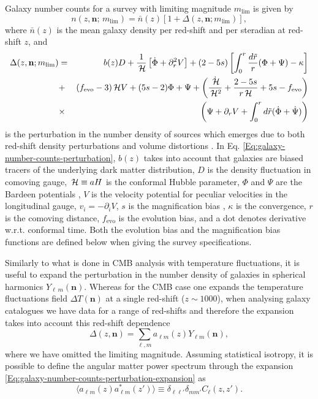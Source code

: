Galaxy number counts for a survey with limiting magnitude $m_{\mathrm{lim}}$ is given by 
\begin{equation}
\label{Eq:galaxy-number-counts}
n(z,\mathbf{n};\,m_{\mathrm{lim}}) = \bar{n}(z) \left[ 1 + \Delta(z,\mathbf{n};m_{\mathrm{lim}}) \right],
\end{equation}  
where $\bar{n}(z)$ is the mean galaxy density per red-shift and per steradian at red-shift $z$, and 
\begin{eqnarray}
\label{Eq:galaxy-number-counts-perturbation}
\Delta(z,\mathbf{n};m_{\mathrm{lim}}) &=&  b(z) D + \frac{1}{\,{\mathcal H}}\left[ \dot{\Phi} + \partial_r^2 V \right] + (2 - 5 s) \left[ \int_0^r \frac{d\tilde{r}}{r}(\Phi + \Psi) - \kappa \right] \nonumber \\
&+&  (f_{\mathrm{evo}} - 3)\,{\mathcal H} V + (5s-2)\Phi + \Psi 
+ \left( \frac{\dot{\,{\mathcal H}}}{\,{\mathcal H}^2} + \frac{2 - 5s}{r\,{\mathcal H}} + 5s - f_{\mathrm{evo}} \right) \nonumber \\
&\times & \left( \Psi + \partial_rV + \int_0^r d\tilde{r}(\dot{\Phi} + \dot{\Psi}) \right) 
\end{eqnarray}
is the perturbation in the number density of sources which emerges due to both red-shift density perturbations and volume distortions \cite{Bonvin:2011bg,Challinor:2011bk,Yoo:2012se}. In Eq. \eqref{Eq:galaxy-number-counts-perturbation}, $b(z)$ takes into account that galaxies are biased tracers of the underlying dark matter distribution, $D$ is the density fluctuation in comoving gauge, $\,{\mathcal H} \equiv aH$ is the conformal Hubble parameter, $\Phi$ and $\Psi$ are the Bardeen potentials \cite{Bardeen:1980kt}, $V$ is the velocity potential for peculiar velocities in the longitudinal gauge, $v_i=-\partial_i V$, $s$ is the magnification bias , $\kappa$ is the convergence, $r$ is the comoving distance, $f_{\mathrm{evo}}$ is the evolution bias, and a dot denotes derivative w.r.t. conformal time. Both the evolution bias and the magnification bias functions are defined below when giving the survey specifications. 

Similarly to what is done in CMB analysis with temperature fluctuations, it is useful to expand the perturbation in the number density of galaxies in spherical harmonics $Y_{\ell\,m}(\mathbf{n})$. Whereas for the CMB case one expands the temperature fluctuations field $\Delta T(\mathbf{n})$ at a single red-shift ($z\sim 1000$), when analysing galaxy catalogues we have data for a range of red-shifts and therefore the expansion takes into account this red-shift dependence
\begin{equation}
\label{Eq:galaxy-number-counts-perturbation-expansion}
\Delta(z,\mathbf{n}) = \sum_{\ell,m} a_{\ell m}(z) Y_{\ell m}(\mathbf{n}), 
\end{equation}   
where we have omitted the limiting magnitude. Assuming statistical isotropy, it is possible to define the angular matter power spectrum through the expansion \eqref{Eq:galaxy-number-counts-perturbation-expansion} as
\begin{equation}
\label{Eq:definition-angular-matter-power-spectrum}
\langle a_{\ell m}(z) a^*_{\ell m}(z') \rangle \equiv \delta_{\ell \ell'} \delta_{m m'} C_\ell(z,z').
\end{equation} 

